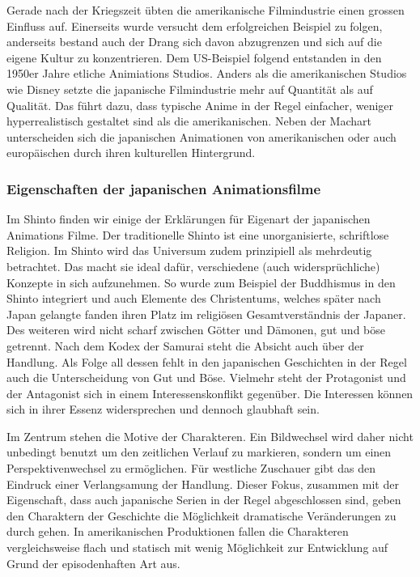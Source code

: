 Gerade nach der Kriegszeit übten die amerikanische Filmindustrie einen grossen Einfluss auf. Einerseits wurde versucht dem erfolgreichen Beispiel zu folgen, anderseits bestand auch der Drang sich davon abzugrenzen und sich auf die eigene Kultur zu konzentrieren. Dem US-Beispiel folgend entstanden in den 1950er Jahre etliche Animiations Studios. Anders als die amerikanischen Studios wie Disney setzte die japanische Filmindustrie mehr auf Quantität als auf Qualität. Das führt dazu, dass typische Anime in der Regel einfacher, weniger hyperrealistisch gestaltet sind als die amerikanischen. Neben der Machart unterscheiden sich die japanischen Animationen von amerikanischen oder auch europäischen durch ihren kulturellen Hintergrund. 

\subsubsection{Eigenschaften der japanischen Animationsfilme}
Im Shinto finden wir einige der Erklärungen für Eigenart der japanischen Animations Filme. Der traditionelle Shinto ist eine unorganisierte, schriftlose Religion. Im Shinto wird das Universum zudem prinzipiell als mehrdeutig betrachtet. Das macht sie ideal dafür, verschiedene (auch widersprüchliche) Konzepte in sich aufzunehmen. So wurde zum Beispiel der Buddhismus in den Shinto integriert und auch Elemente des Christentums, welches später nach Japan gelangte fanden ihren Platz im religiösen Gesamtverständnis der Japaner. Des weiteren wird nicht scharf zwischen Götter und Dämonen, gut und böse getrennt. Nach dem Kodex der Samurai steht die Absicht auch über der Handlung. Als Folge all dessen fehlt in den japanischen Geschichten in der Regel auch die Unterscheidung von Gut und Böse. Vielmehr steht der Protagonist und der Antagonist sich in einem Interessenskonflikt gegenüber. Die Interessen können sich in ihrer Essenz widersprechen und dennoch glaubhaft sein. 

Im Zentrum stehen die Motive der Charakteren. Ein Bildwechsel wird daher nicht unbedingt benutzt um den zeitlichen Verlauf zu markieren, sondern um einen Perspektivenwechsel zu ermöglichen. Für westliche Zuschauer gibt das den Eindruck einer Verlangsamung der Handlung. Dieser Fokus, zusammen mit der Eigenschaft, dass auch japanische Serien in der Regel abgeschlossen sind, geben den Charaktern der Geschichte die Möglichkeit dramatische Veränderungen zu durch gehen. In amerikanischen Produktionen fallen die Charakteren vergleichsweise flach und statisch mit wenig Möglichkeit zur Entwicklung auf Grund der episodenhaften Art aus.

